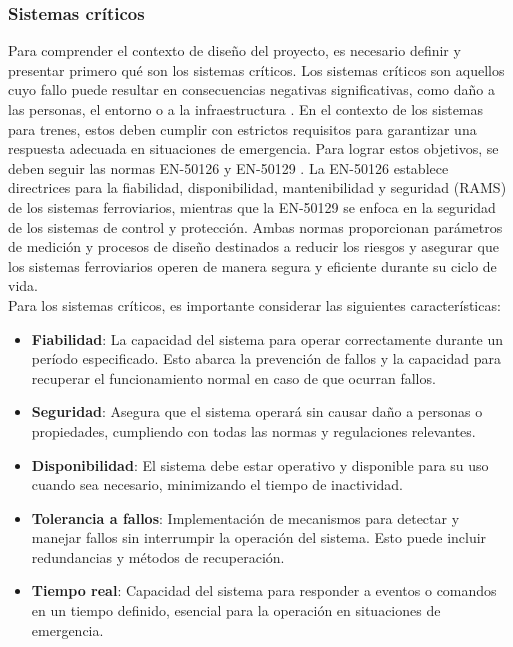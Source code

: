 \subsubsection{Sistemas críticos}

Para comprender el contexto de diseño del proyecto, es necesario definir y presentar primero qué son los sistemas críticos. Los sistemas críticos son aquellos cuyo fallo puede resultar en consecuencias negativas significativas, como daño a las personas, el entorno o a la infraestructura \cite{norma_61508}. En el contexto de los sistemas para trenes, estos deben cumplir con estrictos requisitos para garantizar una respuesta adecuada en situaciones de emergencia. Para lograr estos objetivos, se deben seguir las normas EN-50126 y EN-50129 \cite{norma_50129}. La EN-50126 establece directrices para la fiabilidad, disponibilidad, mantenibilidad y seguridad (RAMS) de los sistemas ferroviarios, mientras que la EN-50129 se enfoca en la seguridad de los sistemas de control y protección. Ambas normas proporcionan parámetros de medición y procesos de diseño destinados a reducir los riesgos y asegurar que los sistemas ferroviarios operen de manera segura y eficiente durante su ciclo de vida.\\


Para los sistemas críticos, es importante considerar las siguientes características: 
\begin{itemize}
    \item \textbf{Fiabilidad}: La capacidad del sistema para operar correctamente durante un período especificado. Esto abarca la prevención de fallos y la capacidad para recuperar el funcionamiento normal en caso de que ocurran fallos. 
    \item \textbf{Seguridad}: Asegura que el sistema operará sin causar daño a personas o propiedades, cumpliendo con todas las normas y regulaciones relevantes.
    \item \textbf{Disponibilidad}: El sistema debe estar operativo y disponible para su uso cuando sea necesario, minimizando el tiempo de inactividad.
    \item \textbf{Tolerancia a fallos}: Implementación de mecanismos para detectar y manejar fallos sin interrumpir la operación del sistema. Esto puede incluir redundancias y métodos de recuperación.
    \item \textbf{Tiempo real}: Capacidad del sistema para responder a eventos o comandos en un tiempo definido, esencial para la operación en situaciones de emergencia.
\end{itemize}

